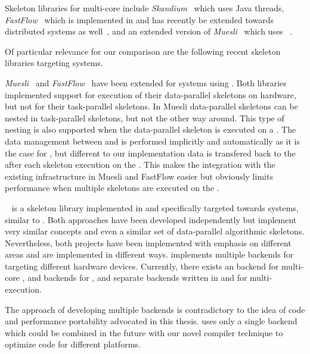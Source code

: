 Skeleton libraries for multi-core \CPUs include \emph{Skandium}~\cite{LeytonP10} which uses Java threads, \emph{FastFlow}~\cite{AldinucciDaKiTo2011,AldinucciDKMT11} which is implemented in \Cpp and has recently be extended towards distributed systems as well~\cite{AldinucciCDKT12}, and an extended version of \emph{Muesli}~\cite{CiechanowiczK10} which uses \OpenMP~\cite{OpenMP}.

\bigskip

Of particular relevance for our comparison are the following recent skeleton libraries targeting \GPU systems.

\bigskip

\emph{Muesli}~\cite{ErnstingK12} and \emph{FastFlow}~\cite{BuonoDLT13,AldinucciSDTP12} have been extended for \GPU systems using \CUDA.
Both libraries implemented support for execution of their data-parallel skeletons on \GPU hardware, but not for their task-parallel skeletons.
In Muesli data-parallel skeletons can be nested in task-parallel skeletons, but not the other way around.
This type of nesting is also supported when the data-parallel skeleton is executed on a \GPU.
The data management between \CPU and \GPU is performed implicitly and automatically as it is the case for \SkelCL, but different to our implementation data is transfered back to the \CPU after each skeleton execution on the \GPU.
This makes the integration with the existing infrastructure in Muesli and FastFlow easier but obviously limits performance when multiple skeletons are executed on the \GPU.

\bigskip

\emph{\SkePU}~\cite{EnmyrenKe10,DastgeerEnKe2011,DastgeerKe14} is a skeleton library implemented in \Cpp and specifically targeted towards \GPU systems, similar to \SkelCL.
Both approaches have been developed independently but implement very similar concepts and even a similar set of data-parallel algorithmic skeletons.
Nevertheless, both projects have been implemented with emphasis on different areas and are implemented in different ways.
\SkePU implements multiple backends for targeting different hardware devices.
Currently, there exists an \OpenMP backend for multi-core \CPUs, \OpenCL and \CUDA backends for \GPUs, and separate backends written in \OpenCL and \CUDA for multi-\GPU execution.

The approach of developing multiple backends is contradictory to the idea of code and performance portability advocated in this thesis.
\SkelCL uses only a single \OpenCL backend which could be combined in the future with our novel compiler technique to optimize code for different platforms.

